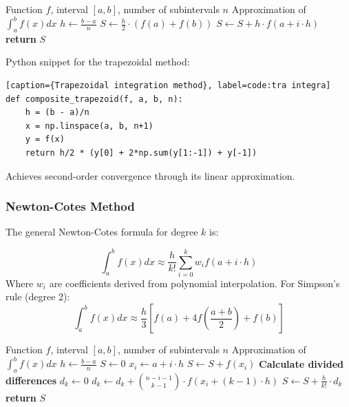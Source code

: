 \documentclass[10pt]{article}
\begin{document}
\begin{algorithm}[H]
\caption{Trapezoid Integration}
\begin{algorithmic}[1]
\Require Function $f$, interval $[a, b]$, number of subintervals $n$
\Ensure Approximation of $\int_{a}^{b} f(x) dx$
\State $h \gets \frac{b - a}{n}$
\State $S \gets \frac{h}{2} \cdot (f(a) + f(b))$
    \State $S \gets S + h \cdot f(a + i \cdot h)$
\EndFor
\State \textbf{return} $S$
\end{algorithmic}
\end{algorithm}

Python snippet for the trapezoidal method:
\begin{lstlisting}[style=custompython][caption={Trapezoidal integration method}, label=code:tra integra]
def composite_trapezoid(f, a, b, n):
    h = (b - a)/n
    x = np.linspace(a, b, n+1)
    y = f(x)
    return h/2 * (y[0] + 2*np.sum(y[1:-1]) + y[-1])
\end{lstlisting}


Achieves second-order convergence through its linear approximation.


\subsubsection{Newton-Cotes Method}

The general Newton-Cotes formula for degree \(k\) is:

\begin{equation}
\int_{a}^{b} f(x)dx \approx \frac{h}{k!}\sum_{i=0}^{k} w_i f(a + i\cdot h)
\end{equation}
Where \(w_i\) are coefficients derived from polynomial interpolation.
For Simpson's rule (degree 2):
\begin{equation}
\int_{a}^{b} f(x)dx \approx \frac{h}{3}\left[f(a) + 4f\left(\frac{a+b}{2}\right) + f(b)\right]
\end{equation}


\begin{algorithm}[H]
\caption{Newton-Cotes Integration}
\begin{algorithmic}[1]
\Require Function $f$, interval $[a, b]$, number of subintervals $n$
\Ensure Approximation of $\int_{a}^{b} f(x) dx$
\State $h \gets \frac{b - a}{n}$
\State $S \gets 0$
    \State $x_i \gets a + i \cdot h$
    \State $S \gets S + f(x_i)$
\EndFor
\State \textbf{Calculate divided differences}
    \State $d_k \gets 0$
        \State $d_k \gets d_k + \binom{n-i-1}{k-1} \cdot f(x_i + (k-1) \cdot h)$
    \EndFor
    \State $S \gets S + \frac{h}{k!} \cdot d_k$
\EndFor
\State \textbf{return} $S$
\end{algorithmic}
\end{algorithm}
\end{document}
